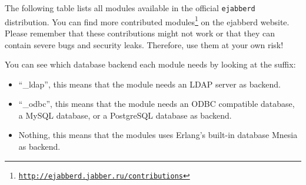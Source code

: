 \documentclass[a4paper,10pt]{article}
\newcommand{\ejabberd}{\texttt{ejabberd}}
\gdef\footahref#1#2{#2\footnote{\href{#1}{\texttt{#1}}}}
\begin{document}
The following table lists all modules available in the official \ejabberd{}
distribution. You can find more
\footahref{http://ejabberd.jabber.ru/contributions}{contributed modules} on the
ejabberd website. Please remember that these contributions might not work or
that they can contain severe bugs and security leaks. Therefore, use them at
your own risk!

You can see which database backend each module needs by looking at the suffix:
\begin{itemize}
\item ``\_ldap'', this means that the module needs an LDAP server as backend.
\item ``\_odbc'', this means that the module needs an ODBC compatible database,
  a MySQL database, or a PostgreSQL database as backend.
\item Nothing, this means that the modules uses Erlang's built-in database
  Mnesia as backend.
\end{itemize}
\end{document}
